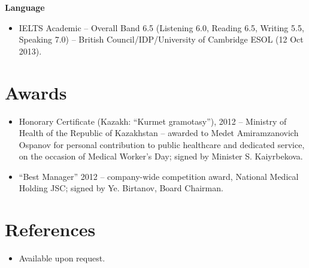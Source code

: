 \documentclass[11pt,a4paper,sans]{moderncv}
\begin{document}
\vspace{2pt}
\textbf{Language}
\begin{itemize}
\item{IELTS Academic -- Overall Band 6.5 (Listening 6.0, Reading 6.5, Writing 5.5, Speaking 7.0) -- British Council/IDP/University of Cambridge ESOL (12 Oct 2013).}
\end{itemize}


\section{Awards}
\vspace{1pt}
\begin{itemize}
\item{Honorary Certificate (Kazakh: ``Kurmet gramotasy''), 2012 -- Ministry of Health of the Republic of Kazakhstan -- awarded to Medet Amiramzanovich Ospanov for personal contribution to public healthcare and dedicated service, on the occasion of Medical Worker's Day; signed by Minister S. Kaiyrbekova.}
\item{``Best Manager'' 2012 -- company-wide competition award, National Medical Holding JSC; signed by Ye. Birtanov, Board Chairman.}
\end{itemize}


\section{References}
\vspace{1pt}
\begin{itemize}
\item{Available upon request.}
\end{itemize}
\end{document}
